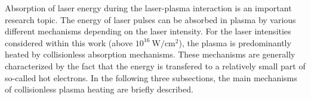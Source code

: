 Absorption of laser energy during the laser-plasma interaction is an important research topic. The energy of laser pulses can be absorbed in plasma by various different mechanisms depending on the laser intensity. For the laser intensities considered within this work (above $ 10^{16} \ \mathrm{W/cm^2} $), the plasma is predominantly heated by collisionless absorption mechanisms. These mechanisms are generally characterized by the fact that the energy is transfered to a relatively small part of so-called hot electrons. In the following three subsections, the main mechanisms of collisionless plasma heating are briefly described.
